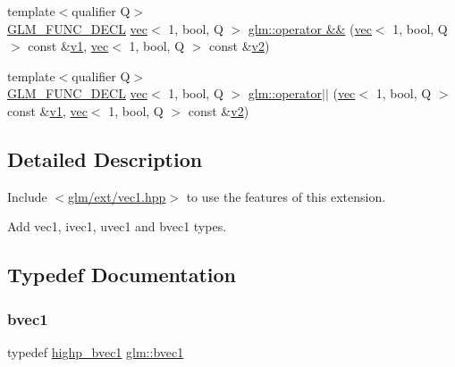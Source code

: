 \begin{DoxyCompactItemize}
\item 
{\footnotesize template$<$qualifier Q$>$ }\\\hyperlink{setup_8hpp_ab2d052de21a70539923e9bcbf6e83a51}{G\+L\+M\+\_\+\+F\+U\+N\+C\+\_\+\+D\+E\+CL} \hyperlink{structglm_1_1vec}{vec}$<$ 1, bool, Q $>$ \hyperlink{group__ext__vec1_ga5836cbb5b58489de3281dc7460e4f2ce}{glm\+::operator \&\&} (\hyperlink{structglm_1_1vec}{vec}$<$ 1, bool, Q $>$ const \&\hyperlink{_s_d_l__opengl__glext_8h_a435c176a02c061b43e19bdf7c86cceae}{v1}, \hyperlink{structglm_1_1vec}{vec}$<$ 1, bool, Q $>$ const \&\hyperlink{_s_d_l__opengl__glext_8h_a0928f6d0f0f794ba000a21dfae422136}{v2})
\item 
{\footnotesize template$<$qualifier Q$>$ }\\\hyperlink{setup_8hpp_ab2d052de21a70539923e9bcbf6e83a51}{G\+L\+M\+\_\+\+F\+U\+N\+C\+\_\+\+D\+E\+CL} \hyperlink{structglm_1_1vec}{vec}$<$ 1, bool, Q $>$ \hyperlink{group__ext__vec1_ga121908a337ee4ab94414dfd4f3518d47}{glm\+::operator$\vert$$\vert$} (\hyperlink{structglm_1_1vec}{vec}$<$ 1, bool, Q $>$ const \&\hyperlink{_s_d_l__opengl__glext_8h_a435c176a02c061b43e19bdf7c86cceae}{v1}, \hyperlink{structglm_1_1vec}{vec}$<$ 1, bool, Q $>$ const \&\hyperlink{_s_d_l__opengl__glext_8h_a0928f6d0f0f794ba000a21dfae422136}{v2})
\end{DoxyCompactItemize}


\subsection{Detailed Description}
Include $<$\hyperlink{ext_2vec1_8hpp}{glm/ext/vec1.\+hpp}$>$ to use the features of this extension.

Add vec1, ivec1, uvec1 and bvec1 types. 

\subsection{Typedef Documentation}
\mbox{\label{group__ext__vec1_ga30260c045e085bb8d19eddca772cac61}} 
\subsubsection{\texorpdfstring{bvec1}{bvec1}}
{\footnotesize\ttfamily typedef \hyperlink{group__ext__vec1_gac7fdd0536d878f87393132b3a7f9ef03}{highp\+\_\+bvec1} \hyperlink{group__ext__vec1_ga30260c045e085bb8d19eddca772cac61}{glm\+::bvec1}}

